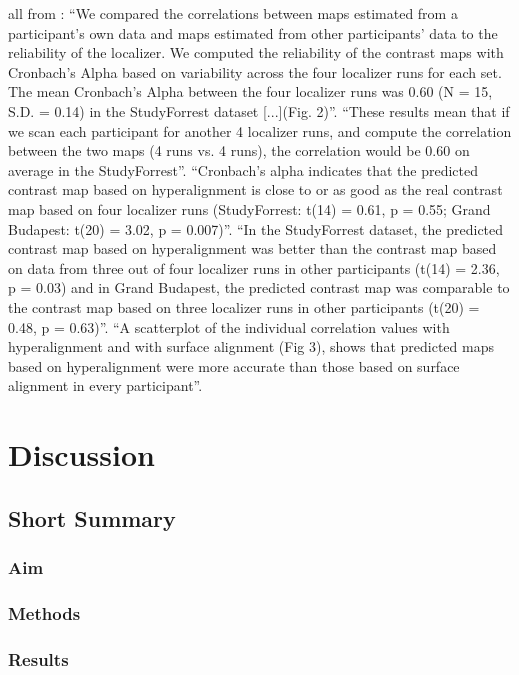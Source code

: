 all from \citep{jiahui2020predicting}: ``We compared the correlations between
maps estimated from a participant's own data and maps estimated from other
participants' data to the reliability of the localizer. We computed the
reliability of the contrast maps with Cronbach's Alpha based on variability
across the four localizer runs for each set. The mean Cronbach's Alpha between
the four localizer runs was 0.60 (N = 15, S.D. = 0.14) in the StudyForrest
dataset [...](Fig. 2)''.
%
``These results mean that if we scan each participant for another 4 localizer
runs, and compute the correlation between the two maps (4 runs vs. 4 runs), the
correlation would be 0.60 on average in the StudyForrest''.
%
``Cronbach's alpha indicates that the predicted contrast map based on
hyperalignment is close to or as good as the real contrast map based on four
localizer runs (StudyForrest: t(14) = 0.61, p = 0.55; Grand Budapest: t(20) =
3.02, p = 0.007)''.
%
``In the StudyForrest dataset, the predicted contrast map based on
hyperalignment was better than the contrast map based on data from three out of
four localizer runs in other participants (t(14) = 2.36, p = 0.03) and in Grand
Budapest, the predicted contrast map was comparable to the contrast map based on
three localizer runs in other participants (t(20) = 0.48, p = 0.63)''.
%
``A scatterplot of the individual correlation values with hyperalignment and
with surface alignment (Fig 3), shows that predicted maps based on
hyperalignment were more accurate than those based on surface alignment in every
participant''.


\section{Discussion}


\subsection{Short Summary}

\subsubsection{Aim}

\subsubsection{Methods}

\subsubsection{Results}


